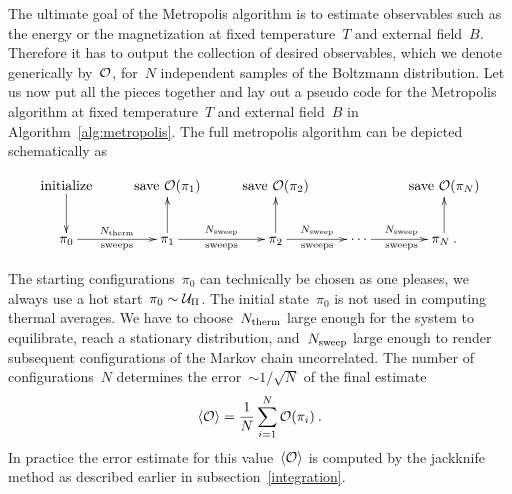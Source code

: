 The ultimate goal of the Metropolis algorithm is to estimate observables such as
the energy or the magnetization at fixed temperature~$T$ and external field~$B$.
Therefore it has to output the collection of desired observables, which we
denote generically by~$\mathcal{O}$, for~$N$ independent samples of the Boltzmann
distribution. Let us now put all the pieces together and lay out a pseudo code
for the Metropolis algorithm at fixed temperature~$T$ and external field~$B$ in
Algorithm~\ref{alg:metropolis}. The full metropolis algorithm can be depicted
schematically as

\begin{equation}
  \xymatrix{%
    \text{initialize} \ar[d]
      &\text{save } \cO(\pi_1)
      &\text{save } \cO(\pi_2)
      && \text{save } \cO(\pi_N) \\
    \pi_0 \ar[r]^{\Ntherm}_{\text{sweeps}}
    & \pi_1 \ar[r]^{\Nsweep}_{\text{sweeps}} \ar[u]
    & \pi_2 \ar[r]^{\Nsweep}_{\text{sweeps}} \ar[u]
    & \cdots \ar[r]^{\Nsweep}_{\text{sweeps}}
    & \pi_N \:. \ar[u]
  }
\end{equation}

The starting configurations~$\pi_0$ can technically be chosen as one pleases, we
always use a hot start~$\pi_0 \sim \mathcal{U}_{\Pi}$. The initial state~$\pi_0$ is not
used in computing thermal averages. We have to choose~$N_{\mathrm{therm}}$ large enough for
the system to equilibrate, \ie{} reach a stationary distribution, and~$N_{\mathrm{sweep}}$
large enough to render subsequent configurations of the Markov chain
uncorrelated. The number of configurations~$N$ determines the error~$\sim
1/\sqrt{N}$ of the final estimate
%
\begin{equation}
  \langle \mathcal{O} \rangle = \frac{1}{N} \sum_{i=1}^N \mathcal{O}(\pi_i) \:.
\end{equation}
%
In practice the error estimate for this value~$\langle \mathcal{O} \rangle$ is computed by the
jackknife method as described earlier in subsection~\ref{integration}.

